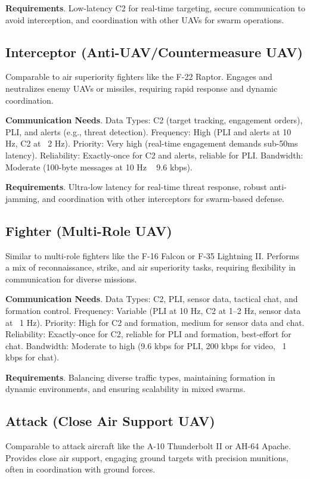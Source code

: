 \documentclass{article}
\begin{document}
\textbf{Requirements}.
Low-latency C2 for real-time targeting, secure communication to avoid interception,
and coordination with other UAVs for swarm operations.

\newpage
\subsection{Interceptor (Anti-UAV/Countermeasure UAV)}
Comparable to air superiority fighters like the F-22 Raptor.
Engages and neutralizes enemy UAVs or missiles, requiring rapid response and dynamic coordination.

\textbf{Communication Needs}.
Data Types: C2 (target tracking, engagement orders), PLI, and alerts (e.g., threat detection).
Frequency: High (PLI and alerts at 10 Hz, C2 at ~2 Hz).
Priority: Very high (real-time engagement demands sub-50ms latency).
Reliability: Exactly-once for C2 and alerts, reliable for PLI.
Bandwidth: Moderate (100-byte messages at 10 Hz ~ 9.6 kbps).

\textbf{Requirements}.
Ultra-low latency for real-time threat response, robust anti-jamming,
and coordination with other interceptors for swarm-based defense.

\subsection{Fighter (Multi-Role UAV)}
Similar to multi-role fighters like the F-16 Falcon or F-35 Lightning II.
Performs a mix of reconnaissance, strike, and air superiority tasks, requiring flexibility in communication for diverse missions.

\textbf{Communication Needs}.
Data Types: C2, PLI, sensor data, tactical chat, and formation control.
Frequency: Variable (PLI at 10 Hz, C2 at 1–2 Hz, sensor data at ~1 Hz).
Priority: High for C2 and formation, medium for sensor data and chat.
Reliability: Exactly-once for C2, reliable for PLI and formation, best-effort for chat.
Bandwidth: Moderate to high (9.6 kbps for PLI, 200 kbps for video, ~1 kbps for chat).

\textbf{Requirements}.
Balancing diverse traffic types, maintaining formation in dynamic environments,
and ensuring scalability in mixed swarms.

\subsection{Attack (Close Air Support UAV)}
Comparable to attack aircraft like the A-10 Thunderbolt II or AH-64 Apache.
Provides close air support, engaging ground targets with precision munitions,
often in coordination with ground forces.
\end{document}
